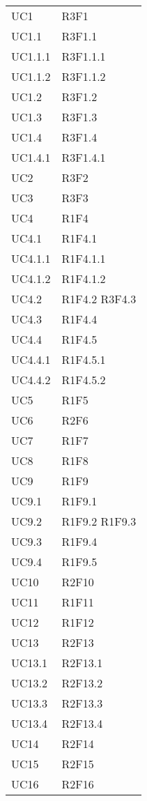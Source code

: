 \begin{longtable} {
		>{\centering}p{28mm}  
		>{}p{20mm}
		}
		UC1 & R3F1 \TBstrut \\ [2mm]
		UC1.1 & R3F1.1 \TBstrut \\ [2mm]
		UC1.1.1 & R3F1.1.1 \TBstrut \\ [2mm]
		UC1.1.2 & R3F1.1.2 \TBstrut \\ [2mm]
		UC1.2 & R3F1.2 \TBstrut \\ [2mm]
		UC1.3 & R3F1.3 \TBstrut \\ [2mm]
		UC1.4 & R3F1.4 \TBstrut \\ [2mm]
		UC1.4.1 & R3F1.4.1 \TBstrut \\ [2mm]
		UC2 & R3F2 \TBstrut \\ [2mm]
		UC3 & R3F3 \TBstrut \\ [2mm]
		UC4 & R1F4 \TBstrut \\ [2mm]
		UC4.1 & R1F4.1 \TBstrut \\ [2mm]
		UC4.1.1 & R1F4.1.1 \TBstrut \\ [2mm]
		UC4.1.2 & R1F4.1.2 \TBstrut \\ [2mm]
		UC4.2 & R1F4.2 R3F4.3 \TBstrut \\ [2mm]
		UC4.3 & R1F4.4 \TBstrut \\ [2mm]
		UC4.4 & R1F4.5 \TBstrut \\ [2mm]
		UC4.4.1 & R1F4.5.1 \TBstrut \\ [2mm]
		UC4.4.2 & R1F4.5.2 \TBstrut \\ [2mm]
		UC5 & R1F5 \TBstrut \\ [2mm]
		UC6 & R2F6 \TBstrut \\ [2mm]
		UC7 & R1F7 \TBstrut \\ [2mm]
		UC8 & R1F8 \TBstrut \\ [2mm]
		UC9 & R1F9 \TBstrut \\ [2mm]
		UC9.1 & R1F9.1 \TBstrut \\ [2mm]
		UC9.2 & R1F9.2 R1F9.3 \TBstrut \\ [2mm]
		UC9.3 & R1F9.4 \TBstrut \\ [2mm]
		UC9.4 & R1F9.5 \TBstrut \\ [2mm]
		UC10 & R2F10 \TBstrut \\ [2mm]
		UC11 & R1F11 \TBstrut \\ [2mm]
		UC12 & R1F12 \TBstrut \\ [2mm]
		UC13 & R2F13 \TBstrut \\ [2mm]
		UC13.1 & R2F13.1 \TBstrut \\ [2mm]
		UC13.2 & R2F13.2 \TBstrut \\ [2mm]
		UC13.3 & R2F13.3 \TBstrut \\ [2mm]
		UC13.4 & R2F13.4 \TBstrut \\ [2mm]
		UC14 & R2F14 \TBstrut \\ [2mm]
		UC15 & R2F15 \TBstrut \\ [2mm]
		UC16 & R2F16 \TBstrut \\ [2mm]	
	\end{longtable}

